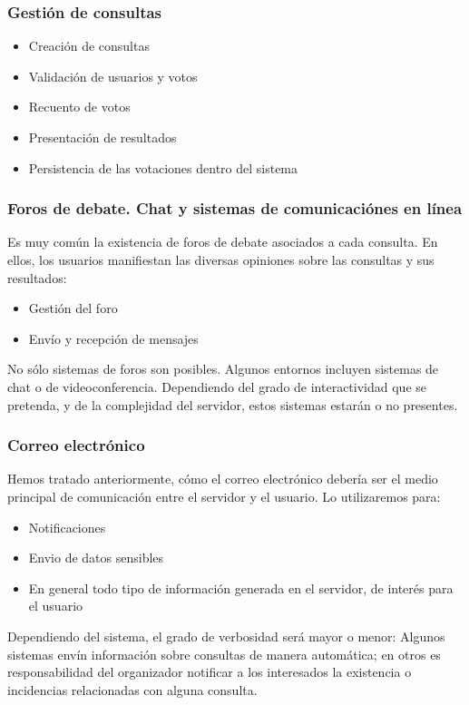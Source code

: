\subsubsection*{Gestión de consultas}
\begin{itemize}
\item Creación de consultas
\item Validación de usuarios y votos
\item Recuento de votos
\item Presentación de resultados
\item Persistencia de las votaciones dentro del sistema
\end{itemize}

\subsubsection*{Foros de debate. Chat y sistemas de comunicaciónes en línea}
Es muy común la existencia de foros de debate asociados a cada consulta. En ellos, los usuarios manifiestan las diversas opiniones sobre las consultas y sus resultados:

\begin{itemize}
\item Gestión del foro
\item Envío y recepción de mensajes
\end{itemize}

No sólo sistemas de foros son posibles. Algunos entornos incluyen sistemas de chat o de videoconferencia. Dependiendo del grado de interactividad que se pretenda, y de la complejidad del servidor, estos sistemas estarán o no presentes.

\subsubsection*{Correo electrónico}
Hemos tratado anteriormente, cómo el correo electrónico debería ser el medio principal de comunicación entre el servidor y el usuario. Lo utilizaremos para:

\begin{itemize}
\item Notificaciones
\item Envio de datos sensibles
\item En general todo tipo de información generada en el servidor, de interés para el usuario
\end{itemize}
Dependiendo del sistema, el grado de verbosidad será mayor o menor: Algunos sistemas envín información sobre consultas de manera automática; en otros es responsabilidad del organizador notificar a los interesados la existencia o incidencias relacionadas con alguna consulta.

